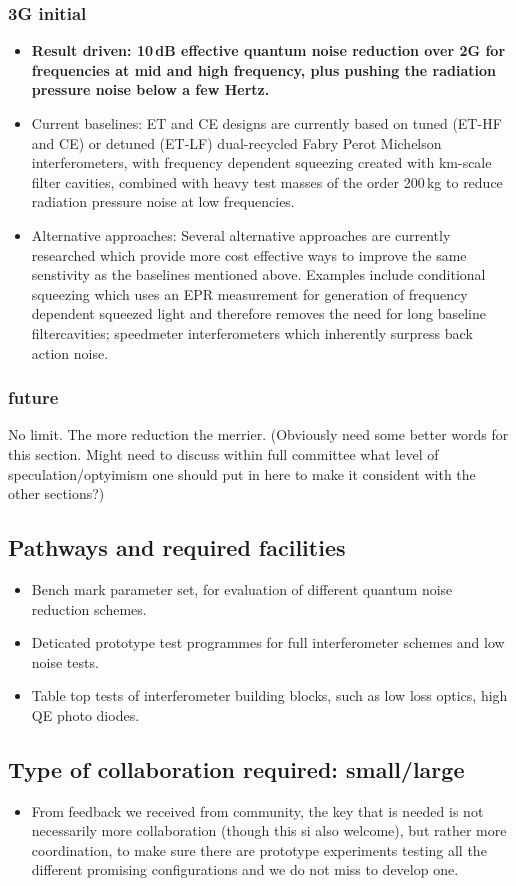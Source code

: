 \subsubsection{3G initial}
\begin{itemize}
\item \textbf{Result driven: 10\,dB effective quantum noise reduction over 2G for frequencies at mid and high frequency, plus pushing the radiation pressure noise below a few Hertz.}
\item Current baselines: ET and CE designs are currently based on tuned (ET-HF and CE) or detuned (ET-LF) dual-recycled Fabry Perot Michelson interferometers, with frequency dependent squeezing created with km-scale filter cavities, combined with heavy test masses of the order 200\,kg to reduce radiation pressure noise at low frequencies. 
\item Alternative approaches: Several alternative approaches are currently researched which provide more cost effective ways to improve the same senstivity as the baselines mentioned above. Examples include conditional squeezing which uses an EPR measurement for generation of frequency dependent squeezed light and therefore removes the need for long baseline filtercavities; speedmeter interferometers which inherently surpress back action noise.     
\end{itemize}
\subsubsection{future}
No limit. The more reduction the merrier. (Obviously need some better words for this section. Might need to discuss within full committee what level of speculation/optyimism one should put in here to make it consident with the other sections?)
\subsection{Pathways and required facilities}
\begin{itemize}
\item Bench mark parameter set, for evaluation of different quantum noise reduction schemes. 
\item Deticated prototype test programmes for full interferometer schemes and low noise tests.
\item Table top tests of interferometer building blocks, such as low loss optics, high QE photo diodes. 
\end{itemize}
\subsection{Type of collaboration required:  small/large}
\begin{itemize}
\item From feedback we received from community, the key that is needed is not 
necessarily more collaboration (though this si also welcome), but rather more coordination, to make sure there are prototype experiments testing all the different promising configurations and we do not miss to develop one. 
\end{itemize}
